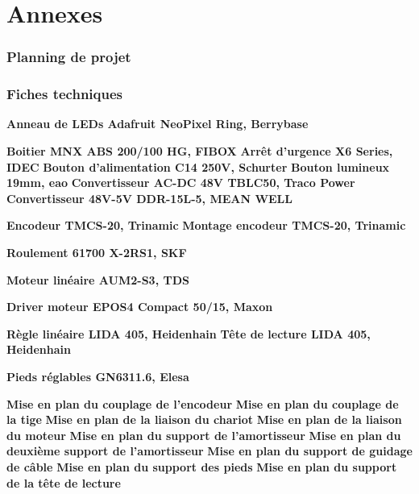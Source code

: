\section*{Annexes}
\subsubsection*{Planning de projet}
\subsubsection*{Fiches techniques}

\textbf{Anneau de LEDs Adafruit NeoPixel Ring, Berrybase}

\textbf{Boitier MNX ABS 200/100 HG, FIBOX}
\newline \textbf{Arrêt d'urgence X6 Series, IDEC}
\newline \textbf{Bouton d'alimentation C14 250V, Schurter}
\newline \textbf{Bouton lumineux 19mm, eao}
\newline \textbf{Convertisseur AC-DC 48V TBLC50, Traco Power}
\newline \textbf{Convertisseur 48V-5V DDR-15L-5, MEAN WELL}

\textbf{Encodeur TMCS-20, Trinamic}
\newline
\textbf{Montage encodeur TMCS-20, Trinamic}

\textbf{Roulement 61700 X-2RS1, SKF}

\textbf{Moteur linéaire AUM2-S3, TDS}

\textbf{Driver moteur EPOS4 Compact 50/15, Maxon}

\textbf{Règle linéaire LIDA 405, Heidenhain}
\newline
\textbf{Tête de lecture LIDA 405, Heidenhain}

\textbf{Pieds réglables GN6311.6, Elesa}

\textbf{Mise en plan du couplage de l'encodeur}
\newline \textbf{Mise en plan du couplage de la tige}
\newline \textbf{Mise en plan de la liaison du chariot}
\newline \textbf{Mise en plan de la liaison du moteur}
\newline \textbf{Mise en plan du support de l'amortisseur}
\newline \textbf{Mise en plan du deuxième support de l'amortisseur}
\newline \textbf{Mise en plan du support de guidage de câble}
\newline \textbf{Mise en plan du support des pieds}
\newline \textbf{Mise en plan du support de la tête de lecture}

